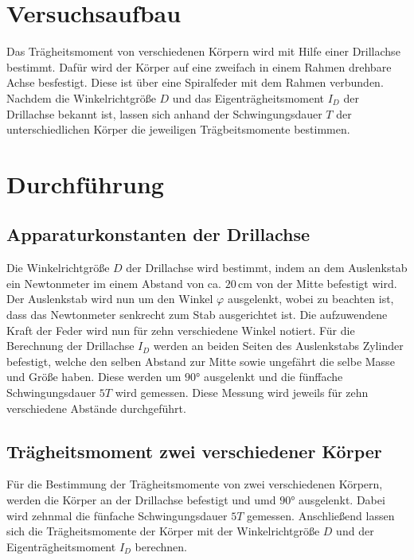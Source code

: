 
\section{Versuchsaufbau}
\label{sec:Versuchsaufbau}
Das Trägheitsmoment von verschiedenen Körpern wird mit Hilfe einer
Drillachse bestimmt. Dafür wird der Körper auf eine zweifach in einem Rahmen 
drehbare Achse besfestigt. Diese ist über eine Spiralfeder mit dem Rahmen 
verbunden. Nachdem die Winkelrichtgröße $D$ und das Eigenträgheitsmoment $I_D$
der Drillachse bekannt ist, lassen sich anhand der Schwingungsdauer $T$ der 
unterschiedlichen Körper die jeweiligen Trägbeitsmomente bestimmen.
%
\section{Durchführung}
\label{sec:Durchführung}
\subsection{Apparaturkonstanten der Drillachse}
\label{sec:Apparturkonstanten}
Die Winkelrichtgröße $D$ der Drillachse wird bestimmt, indem an dem Auslenkstab
ein Newtonmeter im einem Abstand von ca. $20\, \unit{\centi\meter}$ von der Mitte 
befestigt wird. Der Auslenkstab wird nun um den Winkel $\varphi$ ausgelenkt, wobei zu beachten ist,
dass das Newtonmeter senkrecht zum Stab ausgerichtet ist. Die aufzuwendene Kraft der Feder wird nun
für zehn verschiedene Winkel notiert. Für die Berechnung der Drillachse $I_D$ werden an beiden Seiten des 
Auslenkstabs Zylinder befestigt, welche den selben Abstand zur Mitte sowie ungefährt die selbe Masse und Größe
haben. Diese werden um $90°$ ausgelenkt und die fünffache Schwingungsdauer $5T$ wird gemessen. Diese Messung
wird jeweils für zehn verschiedene Abstände durchgeführt.
%
\subsection{Trägheitsmoment zwei verschiedener Körper}
\label{sec:TragheitZweiKörper}
Für die Bestimmung der Trägheitsmomente von zwei verschiedenen Körpern, werden die Körper an der Drillachse
befestigt und umd $90°$ ausgelenkt. Dabei wird zehnmal die fünfache Schwingungsdauer $5T$ gemessen. Anschließend
lassen sich die Trägheitsmomente der Körper mit der Winkelrichtgröße $D$ und der Eigenträgheitsmoment $I_D$ berechnen.
